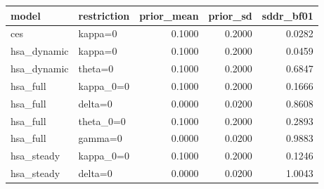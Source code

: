 \begin{tabular}{llrrr}
\toprule
model & restriction & prior\_mean & prior\_sd & sddr\_bf01 \\
\midrule
ces & kappa=0 & 0.1000 & 0.2000 & 0.0282 \\
hsa\_dynamic & kappa=0 & 0.1000 & 0.2000 & 0.0459 \\
hsa\_dynamic & theta=0 & 0.1000 & 0.2000 & 0.6847 \\
hsa\_full & kappa\_0=0 & 0.1000 & 0.2000 & 0.1666 \\
hsa\_full & delta=0 & 0.0000 & 0.0200 & 0.8608 \\
hsa\_full & theta\_0=0 & 0.1000 & 0.2000 & 0.2893 \\
hsa\_full & gamma=0 & 0.0000 & 0.0200 & 0.9883 \\
hsa\_steady & kappa\_0=0 & 0.1000 & 0.2000 & 0.1246 \\
hsa\_steady & delta=0 & 0.0000 & 0.0200 & 1.0043 \\
\bottomrule
\end{tabular}
